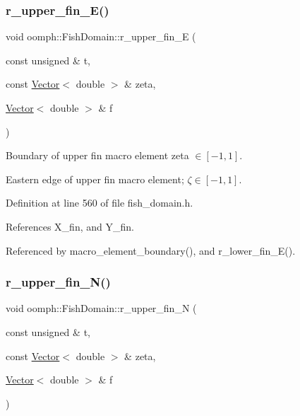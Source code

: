 \mbox{\label{classoomph_1_1FishDomain_a063912bd40138bb84b3cdfc23133eff2}} 
\subsubsection{\texorpdfstring{r\+\_\+upper\+\_\+fin\+\_\+\+E()}{r\_upper\_fin\_E()}}
{\footnotesize\ttfamily void oomph\+::\+Fish\+Domain\+::r\+\_\+upper\+\_\+fin\+\_\+E (\begin{DoxyParamCaption}\item[{const unsigned \&}]{t,  }\item[{const \hyperlink{classoomph_1_1Vector}{Vector}$<$ double $>$ \&}]{zeta,  }\item[{\hyperlink{classoomph_1_1Vector}{Vector}$<$ double $>$ \&}]{f }\end{DoxyParamCaption})\hspace{0.3cm}{\ttfamily [private]}}



Boundary of upper fin macro element zeta $ \in [-1,1] $. 

Eastern edge of upper fin macro element; $ \zeta \in [-1,1] $. 

Definition at line 560 of file fish\+\_\+domain.\+h.



References X\+\_\+fin, and Y\+\_\+fin.



Referenced by macro\+\_\+element\+\_\+boundary(), and r\+\_\+lower\+\_\+fin\+\_\+\+E().

\mbox{\label{classoomph_1_1FishDomain_a6b0cc31071869ef0e4b4794fe5a46d2f}} 
\subsubsection{\texorpdfstring{r\+\_\+upper\+\_\+fin\+\_\+\+N()}{r\_upper\_fin\_N()}}
{\footnotesize\ttfamily void oomph\+::\+Fish\+Domain\+::r\+\_\+upper\+\_\+fin\+\_\+N (\begin{DoxyParamCaption}\item[{const unsigned \&}]{t,  }\item[{const \hyperlink{classoomph_1_1Vector}{Vector}$<$ double $>$ \&}]{zeta,  }\item[{\hyperlink{classoomph_1_1Vector}{Vector}$<$ double $>$ \&}]{f }\end{DoxyParamCaption})\hspace{0.3cm}{\ttfamily [private]}}



